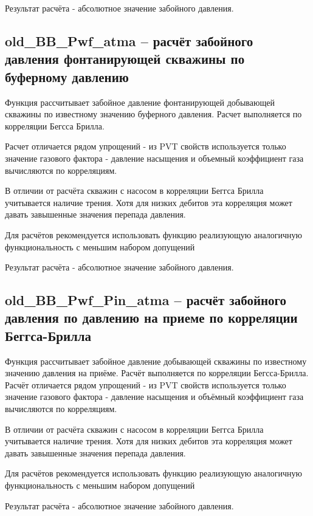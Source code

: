 Результат расчёта - абсолютное значение забойного давления. 

\subsection{old\_BB\_Pwf\_atma – расчёт забойного давления фонтанирующей скважины по буферному давлению}
Функция рассчитывает забойное давление фонтанирующей добывающей скважины по известному значению буферного давления. Расчет выполняется по корреляции Бегсса Брилла. 

Расчет отличается рядом упрощений - из PVT свойств используется только значение газового фактора - давление насыщения и объемный коэффициент газа вычисляются по корреляциям. 

В отличии от расчёта скважин с насосом в корреляции Беггса Брилла учитывается наличие трения. Хотя для низких дебитов эта корреляция может давать завышенные значения перепада давления. 

Для расчётов рекомендуется использовать функцию \unf{} реализующую аналогичную функциональность с меньшим набором допущений

Результат расчёта - абсолютное значение забойного давления. 

\subsection{old\_BB\_Pwf\_Pin\_atma – расчёт забойного давления по давлению на приеме по корреляции Беггса-Брилла}
Функция рассчитывает забойное давление  добывающей скважины по известному значению давления на приёме. Расчёт выполняется по корреляции Бегсса-Брилла. 
Расчёт отличается рядом упрощений - из PVT свойств используется только значение газового фактора - давление насыщения и объёмный коэффициент газа вычисляются по корреляциям. 

В отличии от расчёта скважин с насосом в корреляции Беггса Брилла учитывается наличие трения. Хотя для низких дебитов эта корреляция может давать завышенные значения перепада давления. 

Для расчётов рекомендуется использовать функцию \unf{} реализующую аналогичную функциональность с меньшим набором допущений

Результат расчёта - абсолютное значение забойного давления. 


